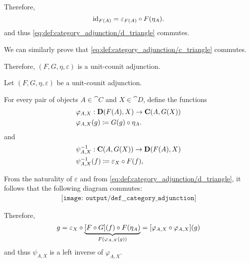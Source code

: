 \begin{defproof}
  Therefore,
  \begin{equation*}
    \id_{F(A)} = \varepsilon_{F(A)} \bincirc F(\eta_A).
  \end{equation*}
  and thus \eqref{eq:def:category_adjunction/d_triangle} commutes.

  We can similarly prove that \eqref{eq:def:category_adjunction/c_triangle} commutes.

  Therefore, \( (F, G, \eta, \varepsilon) \) is a unit-counit adjunction.

   Let \( (F, G, \eta, \varepsilon) \) be a unit-counit adjunction.

  For every pair of objects \( A \in \cat{C} \) and \( X \in \cat{D} \), define the functions
  \begin{equation*}
    \begin{aligned}
      &\varphi_{A,X}: \cat{D}(F(A), X) \to \cat{C}(A, G(X)) \\
      &\varphi_{A,X}(g) \coloneqq G(g) \bincirc \eta_A.
    \end{aligned}
  \end{equation*}
  and
  \begin{equation*}
    \begin{aligned}
      &\psi_{A,X}^{-1}: \cat{C}(A, G(X)) \to \cat{D}(F(A), X) \\
      &\psi_{A,X}^{-1}(f) \coloneqq \varepsilon_X \bincirc F(f),
    \end{aligned}
  \end{equation*}

  From the naturality of \( \varepsilon \) and from \eqref{eq:def:category_adjunction/d_triangle}, it follows that the following diagram commutes:
  \begin{equation}\label{eq:def:category_adjunction/varphi_inverse_def}
    \begin{aligned}
      \texttt{[image: output/def\_\_category\_adjunction]}
    \end{aligned}
  \end{equation}

  Therefore,
  \begin{equation*}
    g = \varepsilon_X \bincirc \underbrace{[F \bincirc G](f) \bincirc F(\eta_A)}_{F(\varphi_{A,X}(g))} = [\varphi_{A,X} \bincirc \varphi_{A,X}](g)
  \end{equation*}
  and thus \( \psi_{A,X} \) is a left inverse of \( \varphi_{A,X} \).


\end{defproof}
